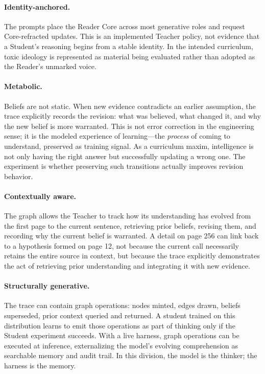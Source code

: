 \paragraph{Identity-anchored.} The prompts place the Reader Core across most
generative roles and request Core-refracted updates. This is an implemented
Teacher policy, not evidence that a Student's reasoning begins from a stable
identity. In the intended curriculum, toxic ideology is represented as material
being evaluated rather than adopted as the Reader's unmarked voice.

\paragraph{Metabolic.} Beliefs are not static. When new evidence contradicts an earlier assumption, the trace explicitly records the revision: what was believed, what changed it, and why the new belief is more warranted. This is not error correction in the engineering sense; it is the modeled experience of learning---the \textit{process} of coming to understand, preserved as training signal. As a curriculum maxim, intelligence is not only having the right answer but successfully updating a wrong one. The experiment is whether preserving such transitions actually improves revision behavior.

\paragraph{Contextually aware.} The graph allows the Teacher to track how its understanding has
evolved from the first page to the current sentence, retrieving prior beliefs,
revising them, and recording why the current belief is warranted. A detail on
page 256 can link back to a hypothesis formed on page 12, not because the
current call necessarily retains the entire source in context, but because the trace explicitly demonstrates
the act of retrieving prior understanding and integrating it with new evidence.

\paragraph{Structurally generative.} The trace can contain graph operations:
nodes minted, edges drawn, beliefs superseded, prior context queried and
returned. A student trained on this distribution learns to emit those
operations as part of thinking only if the Student experiment succeeds. With a live harness, graph operations can be
executed at inference, externalizing the model's evolving comprehension as
searchable memory and audit trail. In this division, the model is the thinker;
the harness is the memory.

